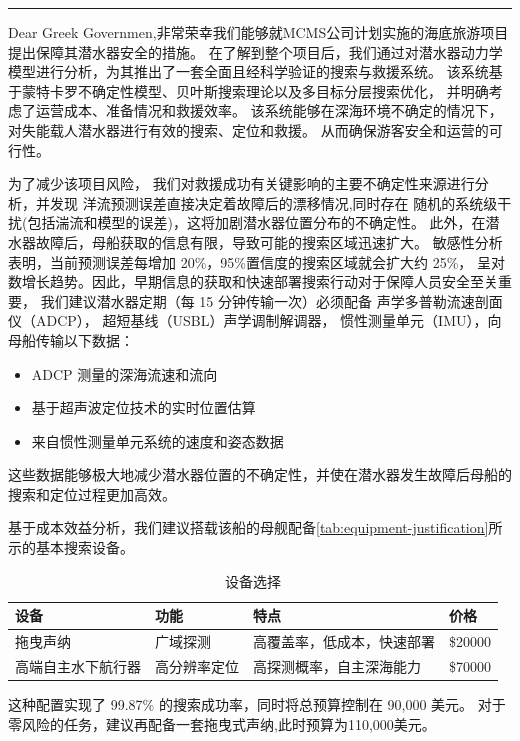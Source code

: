 \documentclass{mcmthesis}
\begin{document}
\noindent\rule{\textwidth}{1.5pt}
\vspace{0.5cm}

Dear Greek Governmen,非常荣幸我们能够就MCMS公司计划实施的海底旅游项目提出保障其潜水器安全的措施。
在了解到整个项目后，我们通过对潜水器动力学模型进行分析，为其推出了一套全面且经科学验证的搜索与救援系统。
该系统基于蒙特卡罗不确定性模型、贝叶斯搜索理论以及多目标分层搜索优化，
并明确考虑了运营成本、准备情况和救援效率。
该系统能够在深海环境不确定的情况下，
对失能载人潜水器进行有效的搜索、定位和救援。
从而确保游客安全和运营的可行性。

为了减少该项目风险，
我们对救援成功有关键影响的主要不确定性来源进行分析，并发现
洋流预测误差直接决定着故障后的漂移情况,同时存在
随机的系统级干扰(包括湍流和模型的误差)，这将加剧潜水器位置分布的不确定性。
此外，在潜水器故障后，母船获取的信息有限，导致可能的搜索区域迅速扩大。
敏感性分析表明，当前预测误差每增加 20\%，95\%置信度的搜索区域就会扩大约 25\%，
呈对数增长趋势。因此，早期信息的获取和快速部署搜索行动对于保障人员安全至关重要，
我们建议潜水器定期（每 15 分钟传输一次）必须配备
   声学多普勒流速剖面仪（ADCP），
   超短基线（USBL）声学调制解调器，
  惯性测量单元（IMU），向母船传输以下数据：
\begin{itemize}
  \item ADCP 测量的深海流速和流向
  \item 基于超声波定位技术的实时位置估算
  \item 来自惯性测量单元系统的速度和姿态数据
\end{itemize}
这些数据能够极大地减少潜水器位置的不确定性，并使在潜水器发生故障后母船的搜索和定位过程更加高效。


基于成本效益分析，我们建议搭载该船的母舰配备\autoref{tab:equipment-justification}所示的基本搜索设备。
\begin{table}[htbp]
\centering
\caption{设备选择}
\label{tab:equipment-justification}
\begin{tabular}{llll}
\toprule
\textbf{设备} & \textbf{功能} & \textbf{特点}& \textbf{价格} \\
\midrule
拖曳声纳 & 广域探测 & 高覆盖率，低成本，快速部署 & \$20000 \\
高端自主水下航行器 & 高分辨率定位 & 高探测概率，自主深海能力& \$70000  \\
\bottomrule
\end{tabular}
\end{table}
这种配置实现了 99.87\% 的搜索成功率，同时将总预算控制在 90,000 美元。
对于零风险的任务，建议再配备一套拖曳式声纳,此时预算为110,000美元。
\end{document}
